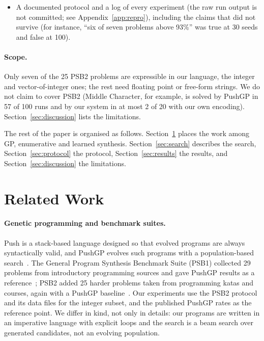 \documentclass[sigconf,nonacm]{acmart}
\begin{document}
\begin{itemize}
  \item A documented protocol and a log of every experiment (the raw run output is not committed; see Appendix~\ref{app:repro}), including the claims that did not survive (for instance, ``six of
        seven problems above 93\%'' was true at 30 seeds and false at 100).
\end{itemize}

\paragraph{Scope.}
Only seven of the 25 PSB2 problems are expressible in our language, the integer and vector-of-integer ones; the rest need floating
point or free-form strings. We do not claim to cover PSB2 (Middle Character, for example, is solved by PushGP in 57 of 100 runs and by our system in at most 2 of 20 with our own encoding). Section~\ref{sec:discussion} lists the limitations.

The rest of the paper is organised as follows. Section~\ref{sec:related} places the work among GP, enumerative and learned
synthesis. Section~\ref{sec:search} describes the search, Section~\ref{sec:protocol} the protocol, Section~\ref{sec:results} the results,
and Section~\ref{sec:discussion} the limitations.

\section{Related Work}
\label{sec:related}

\paragraph{Genetic programming and benchmark suites.}
Push is a stack-based language designed so that evolved programs are always syntactically valid, and PushGP evolves such programs
with a population-based search~\cite{spector2002push}. The General Program Synthesis Benchmark Suite (PSB1) collected 29 problems from
introductory programming sources and gave PushGP results as a reference~\cite{helmuth2015psb1}; PSB2 added 25 harder problems taken
from programming katas and courses, again with a PushGP baseline~\cite{helmuth2021psb2}. Our experiments use the PSB2 protocol and its
data files for the integer subset, and the published PushGP rates as the reference point. We differ in kind, not only in
details: our programs are written in an imperative language with explicit loops and the search is a beam search over generated
candidates, not an evolving population.
\end{document}
